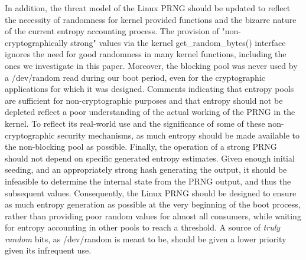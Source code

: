 In addition, the threat model of the Linux PRNG should be updated to reflect the necessity of randomness for kernel provided functions and the bizarre nature of the current entropy accounting process.  The provision of "non-cryptographically strong" values via the kernel get\_random\_bytes() interface ignores the need for good randomness in many kernel functions, including the ones we investigate in this paper.  Moreover, the blocking pool was never used by a /dev/random read during our boot period, even for the cryptographic applications for which it was designed.  Comments indicating that entropy pools are sufficient for non-cryptographic purposes and that entropy should not be depleted reflect a poor understanding of the actual working of the PRNG in the kernel.  To reflect its real-world use and the significance of some of these non-cryptographic security mechanisms, as much entropy should be made available to the non-blocking pool as possible.  Finally, the operation of a strong PRNG should not depend on specific generated entropy estimates.  Given enough initial seeding, and an appropriately strong hash generating the output, it should be infeasible to determine the internal state from the PRNG output, and thus the subsequent values. Consequently, the Linux PRNG should be designed to ensure as much entropy generation as possible at the very beginning of the boot process, rather than providing poor random values for almost all consumers, while waiting for entropy accounting in other pools to reach a threshold.  A source of \textit{truly random} bits, as /dev/random is meant to be, should be given a lower priority given its infrequent use.

